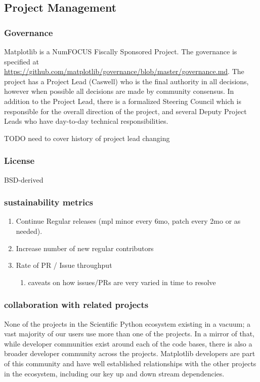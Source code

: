\documentclass[12pt]{article}
\numberwithin{page}{section}
\begin{document}
\subsection{Project Management}
\subsubsection{Governance}
Matplotlib is a NumFOCUS Fiscally Sponsored Project.  The governance
is specified at
\url{https://github.com/matplotlib/governance/blob/master/governance.md}.
The project has a Project Lead (Caswell) who is the final authority in
all decisions, however when possible all decisions are made by
community consensus.  In addition to the Project Lead, there is a
formalized Steering Council which is responsible for the overall
direction of the project, and several Deputy Project Leads who have
day-to-day technical responsibilities.

TODO need to cover history of project lead changing

\subsubsection{License}

BSD-derived

\subsubsection{sustainability metrics}
\begin{enumerate}
\item Continue Regular releases (mpl minor every 6mo, patch every 2mo
  or as needed).
\item Increase number of new regular contributors
\item Rate of PR / Issue throughput
  \begin{enumerate}
  \item caveats on how issues/PRs are very varied in time to resolve
  \end{enumerate}
\end{enumerate}

\subsubsection{collaboration with related projects}

None of the projects in the Scientific Python ecosystem existing in a
vacuum; a vast majority of our users use more than one of the
projects.  In a mirror of that, while developer communities exist
around each of the code bases, there is also a broader developer
community across the projects.  Matplotlib developers are part of this
community and have well established relationships with the other
projects in the ecosystem, including our key up and down stream
dependencies.
\end{document}
